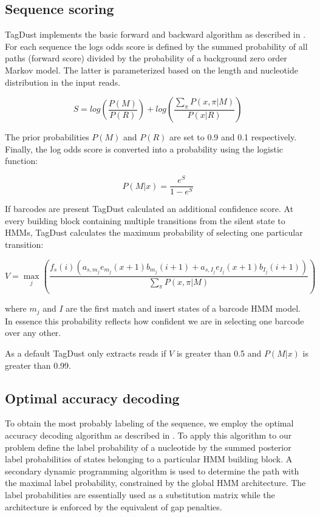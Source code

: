 \documentclass[a4,center,fleqn]{NAR}
\begin{document}
\subsection{Sequence scoring} 

TagDust implements the basic forward and backward algorithm as described in \citep{durbin}. For each sequence the logs odds score is defined by the summed probability of all paths (forward score) divided by the probability of a background zero order Markov model. The latter is parameterized based on the length and nucleotide distribution in the input reads. 

\begin{equation}
	S  = log \left(  \frac{P(M)}{P(R)} \right) + log \left(\frac{\sum\limits_{\pi} P(x,\pi | M )}{P(x | R ) } \right)
\end{equation}

The prior probabilities $P(M)$ and  $P(R)$ are set to 0.9 and 0.1 respectively. Finally, the log odds score is converted into a probability using the logistic function:

\begin{equation}
	P(M | x) = \frac{e^S}{1-e^S}
\end{equation}

If barcodes are present TagDust calculated an additional confidence score. At every building block containing multiple transitions from the silent state to HMMs, TagDust calculates the maximum probability of selecting one particular transition:       


\begin{equation}
	V = \max_j \left( \frac{f_s(i)  ( a_{s,m_j} e_{m_j}(x+1) b_{m_j}(i+1)+  a_{s,I_j} e_{I_j}(x+1) b_{I_j}(i+1))}{\sum\limits_{\pi} P(x,\pi | M )}\right)
\end{equation}

where $m_j$ and $I$ are the first match and insert states of a barcode HMM model. In essence this probability reflects how confident we are in selecting one barcode over any other. 

As a default TagDust only extracts reads if $V$ is greater than 0.5 and $P(M | x)$ is greater than 0.99. 

\subsection{Optimal accuracy decoding} 

To obtain the most probably labeling of the sequence, we employ the optimal accuracy decoding algorithm as described in \citep{Kall:2005vg}. To apply this algorithm to our problem define the label probability of a nucleotide by the summed posterior label probabilities of states belonging to a particular HMM building block. A secondary dynamic programming algorithm is used to determine the path with the maximal label probability, constrained by the global HMM architecture. The label probabilities are essentially used as a substitution matrix while the architecture is enforced by the equivalent of gap penalties. 
\end{document}

